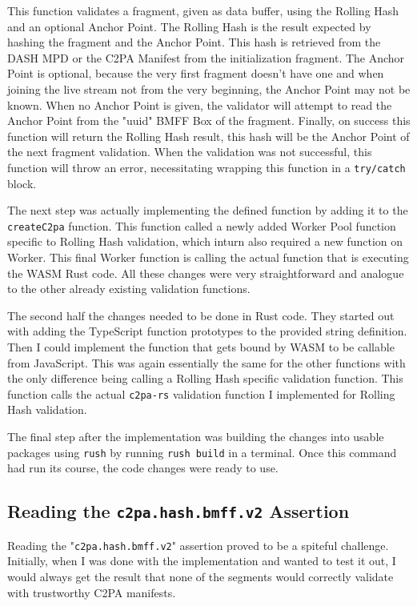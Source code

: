 This function validates a fragment, given as data buffer, using the Rolling Hash and an optional Anchor Point. The Rolling Hash is the result expected by hashing the fragment and the Anchor Point. This hash is retrieved from the DASH MPD or the C2PA Manifest from the initialization fragment. The Anchor Point is optional, because the very first fragment doesn't have one and when joining the live stream not from the very beginning, the Anchor Point may not be known. When no Anchor Point is given, the validator will attempt to read the Anchor Point from the "uuid" BMFF Box of the fragment. Finally, on success this function will return the Rolling Hash result, this hash will be the Anchor Point of the next fragment validation. When the validation was not successful, this function will throw an error, necessitating wrapping this function in a \texttt{try/catch} block.

The next step was actually implementing the defined function by adding it to the \texttt{createC2pa} function. This function called a newly added Worker Pool function specific to Rolling Hash validation, which inturn also required a new function on Worker. This final Worker function is calling the actual function that is executing the WASM Rust code. All these changes were very straightforward and analogue to the other already existing validation functions.

The second half the changes needed to be done in Rust code. They started out with adding the TypeScript function prototypes to the provided string definition. Then I could implement the function that gets bound by WASM to be callable from JavaScript. This was again essentially the same for the other functions with the only difference being calling a Rolling Hash specific validation function. This function calls the actual \texttt{c2pa-rs} validation function I implemented for Rolling Hash validation.

The final step after the implementation was building the changes into usable packages using \texttt{rush} by running \texttt{rush build} in a terminal. Once this command had run its course, the code changes were ready to use.

\subsection{Reading the \texttt{c2pa.hash.bmff.v2} Assertion}

Reading the "\texttt{c2pa.hash.bmff.v2}" assertion proved to be a spiteful challenge. Initially, when I was done with the implementation and wanted to test it out, I would always get the result that none of the segments would correctly validate with trustworthy C2PA manifests.

